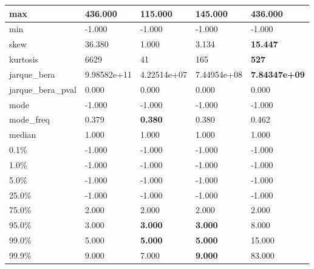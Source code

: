 \begin{table}[H]
\begin{tabular}{|l|m{10em}|m{10em}|m{10em}|m{10em}|}
\hline max & 436.000 & \cellcolor[rgb]{0.9, 0.54, 0.52} 115.000 & 145.000 & \bfseries 436.000 \\
\hline min & -1.000 & -1.000 & -1.000 & -1.000 \\
\hline skew & 36.380 & \cellcolor[rgb]{0.9, 0.54, 0.52} 1.000 & 3.134 & \bfseries 15.447 \\
\hline kurtosis & 6629 & \cellcolor[rgb]{0.9, 0.54, 0.52} 41 & 165 & \bfseries 527 \\
\hline jarque\_bera & 9.98582e+11 & \cellcolor[rgb]{0.9, 0.54, 0.52} 4.22514e+07 & 7.44954e+08 & \bfseries 7.84347e+09 \\
\hline jarque\_bera\_pval & 0.000 & 0.000 & 0.000 & 0.000 \\
\hline mode & -1.000 & -1.000 & -1.000 & -1.000 \\
\hline mode\_freq & 0.379 & \bfseries 0.380 & 0.380 & \cellcolor[rgb]{0.9, 0.54, 0.52} 0.462 \\
\hline median & 1.000 & 1.000 & 1.000 & 1.000 \\
\hline 0.1\% & -1.000 & -1.000 & -1.000 & -1.000 \\
\hline 1.0\% & -1.000 & -1.000 & -1.000 & -1.000 \\
\hline 5.0\% & -1.000 & -1.000 & -1.000 & -1.000 \\
\hline 25.0\% & -1.000 & -1.000 & -1.000 & -1.000 \\
\hline 75.0\% & 2.000 & 2.000 & 2.000 & 2.000 \\
\hline 95.0\% & 3.000 & \bfseries 3.000 & \bfseries 3.000 & \cellcolor[rgb]{0.9, 0.54, 0.52} 8.000 \\
\hline 99.0\% & 5.000 & \bfseries 5.000 & \bfseries 5.000 & \cellcolor[rgb]{0.9, 0.54, 0.52} 15.000 \\
\hline 99.9\% & 9.000 & 7.000 & \bfseries 9.000 & \cellcolor[rgb]{0.9, 0.54, 0.52} 83.000 \\
\hline
\end{tabular}
\end{table}
